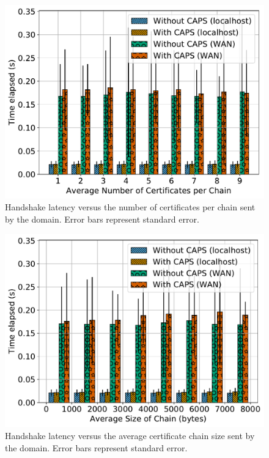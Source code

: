 \begin{figure}[t]
  \centering
  \includegraphics[width=\linewidth]{fig/eval_tls_ext/2-time_elapsed_vs_num_certs_per_chain}
  \caption{Handshake latency versus the number of certificates per chain sent by the
  domain. Error bars represent standard error.}
  \label{fig:numcerts}
\end{figure}

\begin{figure}[t]
  \centering
  \includegraphics[width=\linewidth]{fig/eval_tls_ext/3-time_elapsed_vs_avg_chain_size}
  \caption{Handshake latency versus the average certificate chain size sent by the
  domain. Error bars represent standard error.}
  \label{fig:chainsize}
\end{figure}

